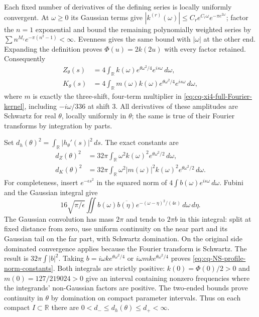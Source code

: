 Each fixed number of derivatives of the defining series is
locally uniformly convergent. At $\omega\geq0$ its Gaussian
terms give
$|k^{(r)}(\omega)|\leq C_r e^{C_r\omega}
 e^{-\pi e^{2\omega}}$; factor the $n=1$ exponential and
bound the remaining polynomially weighted series by
$\sum n^{M_r}e^{-\pi(n^2-1)}<\infty$.
Evenness gives the same bound with $|\omega|$ at the other end.
Expanding the definition proves
$\Phi(u)=2k(2u)$ with every factor retained. Consequently
\begin{equation}
\begin{aligned}
 Z_\theta(s)&=4\int_{\mathbb R}k(\omega)
                       e^{\theta\omega^2/4}e^{is\omega}\,d\omega,\\
 K_\theta(s)&=4\int_{\mathbb R}m(\omega)k(\omega)
                       e^{\theta\omega^2/4}e^{is\omega}\,d\omega ,
\end{aligned}
\label{eq:cq-NS-original-Fourier}
\end{equation}
where $m$ is exactly the three-shift, four-term multiplier
in \eqref{eq:cq-xi4-full-Fourier-kernel}, including
$-i\omega/336$ at shift $3$.
All derivatives of these amplitudes are Schwartz for real
$\theta$, locally uniformly in $\theta$; the same is true
of their Fourier transforms by integration by parts.

Set $d_h(\theta)^2=\int_{\mathbb R}|h_\theta'(s)|^2\,ds$.
The exact constants are
\begin{equation}
\begin{aligned}
 d_Z(\theta)^2&=32\pi\int_{\mathbb R}\omega^2 k(\omega)^2
                                   e^{\theta\omega^2/2}\,d\omega,\\
 d_K(\theta)^2&=32\pi\int_{\mathbb R}\omega^2|m(\omega)|^2
                            k(\omega)^2e^{\theta\omega^2/2}\,d\omega .
\end{aligned}
\label{eq:cq-NS-profile-norm-constants}
\end{equation}
For completeness, insert $e^{-\epsilon s^2}$ in the
squared norm of $4\int b(\omega)e^{is\omega}\,d\omega$.
Fubini and the Gaussian integral give
\[
 16\sqrt{\pi/\epsilon}\iint
 b(\omega)\overline{b(\eta)}
             e^{-(\omega-\eta)^2/(4\epsilon)}\,d\omega\,d\eta .
\]
The Gaussian convolution has mass $2\pi$ and tends to
$2\pi b$ in this integral: split at fixed distance from
zero, use uniform continuity on the near part and its
Gaussian tail on the far part, with Schwartz domination.
On the original side dominated convergence applies because
the Fourier transform is Schwartz. The result is
$32\pi\int|b|^2$. Taking
$b=i\omega k e^{\theta\omega^2/4}$ or
$i\omega m k e^{\theta\omega^2/4}$ proves
\eqref{eq:cq-NS-profile-norm-constants}.
Both integrals are strictly positive:
$k(0)=\Phi(0)/2>0$ and $m(0)=127/219024>0$
give an interval containing nonzero frequencies where the
integrands' non-Gaussian factors are positive.
The two-ended bounds prove continuity in $\theta$ by
domination on compact parameter intervals. Thus on each
compact $I\subset\mathbb R$ there are
$0<d_-\leq d_h(\theta)\leq d_+<\infty$.

